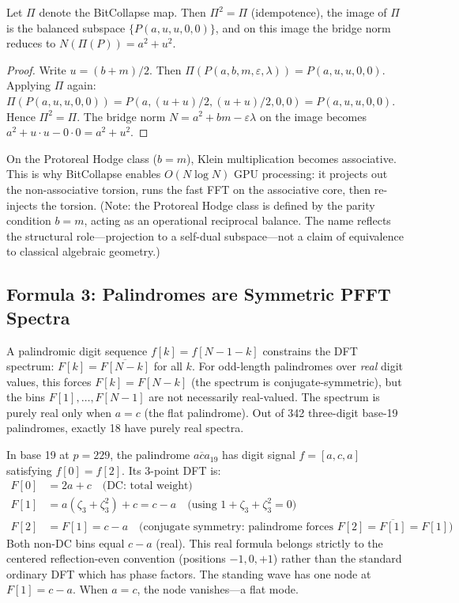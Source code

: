 \begin{proposition}\label{prop:bitcollapse}
Let $\Pi$ denote the BitCollapse map. Then $\Pi^2 = \Pi$ (idempotence), the image of $\Pi$ is the balanced subspace $\{P(a, u, u, 0, 0)\}$, and on this image the bridge norm reduces to $N(\Pi(P)) = a^2 + u^2$.
\end{proposition}

\begin{proof}
Write $u = (b+m)/2$. Then $\Pi(P(a,b,m,\varepsilon,\lambda)) = P(a,u,u,0,0)$. Applying $\Pi$ again: $\Pi(P(a,u,u,0,0)) = P(a, (u+u)/2, (u+u)/2, 0, 0) = P(a,u,u,0,0)$. Hence $\Pi^2 = \Pi$. The bridge norm $N = a^2 + bm - \varepsilon\lambda$ on the image becomes $a^2 + u \cdot u - 0 \cdot 0 = a^2 + u^2$. \qedhere
\end{proof}

\begin{remark}
On the Protoreal Hodge class ($b = m$), Klein multiplication becomes associative. This is why BitCollapse enables $O(N \log N)$ GPU processing: it projects out the non-associative torsion, runs the fast FFT on the associative core, then re-injects the torsion. (Note: the Protoreal Hodge class is defined by the parity condition $b = m$, acting as an operational reciprocal balance. The name reflects the structural role---projection to a self-dual subspace---not a claim of equivalence to classical algebraic geometry.)
\end{remark}

\subsection{Formula 3: Palindromes are Symmetric PFFT Spectra}

A palindromic digit sequence $f[k] = f[N-1-k]$ constrains the DFT spectrum: $F[k] = \overline{F[N-k]}$ for all $k$. For odd-length palindromes over \emph{real} digit values, this forces $F[k] = F[N-k]$ (the spectrum is conjugate-symmetric), but the bins $F[1], \ldots, F[N-1]$ are not necessarily real-valued. The spectrum is purely real only when $a = c$ (the flat palindrome). Out of 342 three-digit base-19 palindromes, exactly 18 have purely real spectra.

In base 19 at $p = 229$, the palindrome $\overline{aca}_{19}$ has digit signal $f = [a, c, a]$ satisfying $f[0] = f[2]$. Its 3-point DFT is:
\begin{align}
F[0] &= 2a + c \quad \text{(DC: total weight)} \\
F[1] &= a(\zeta_3 + \zeta_3^2) + c = c - a \quad \text{(using } 1 + \zeta_3 + \zeta_3^2 = 0\text{)} \\
F[2] &= F[1] = c - a \quad \text{(conjugate symmetry: palindrome forces } F[2] = \overline{F[1]} = F[1]\text{)}
\end{align}
Both non-DC bins equal $c - a$ (real). This real formula belongs strictly to the centered reflection-even convention (positions $-1, 0, +1$) rather than the standard ordinary DFT which has phase factors. The standing wave has one node at $F[1] = c - a$. When $a = c$, the node vanishes---a flat mode.

